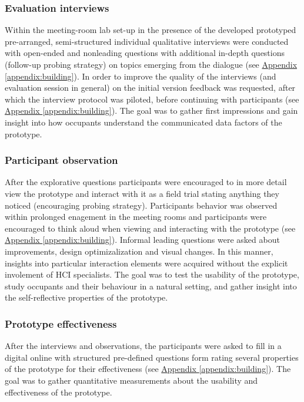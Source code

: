 \subsubsection{Evaluation interviews}

Within the meeting-room lab set-up in the presence of the developed prototyped pre-arranged, semi-structured individual qualitative interviews were conducted with open-ended and nonleading questions with additional in-depth questions (follow-up probing strategy) on topics emerging from the dialogue (see \hyperref[appendix:building]{Appendix \ref*{appendix:building}}). In order to improve the quality of the interviews (and evaluation session in general) on the initial version feedback was requested, after which the interview protocol was piloted, before continuing with participants (see \hyperref[appendix:building]{Appendix \ref*{appendix:building}}). The goal was to gather first impressions and gain insight into how occupants understand the communicated data factors of the prototype.

\subsubsection{Participant observation}

After the explorative questions participants were encouraged to in more detail view the prototype and interact with it as a field trial stating anything they noticed (encouraging probing strategy). Participants behavior was observed within prolonged enagement in the meeting rooms and participants were encouraged to think aloud when viewing and interacting with the prototype (see \hyperref[appendix:building]{Appendix \ref*{appendix:building}}). Informal leading questions were asked about improvements, design optimizalization and visual changes. In this manner, insights into particular interaction elements were acquired without the explicit involement of HCI specialists. The goal was to test the usability of the prototype, study occupants and their behaviour in a natural setting, and gather insight into the self-reflective properties of the prototype. 

\subsubsection{Prototype effectiveness}

After the interviews and observations, the participants were asked to fill in a digital online with structured pre-defined questions form rating several properties of the prototype for their effectiveness (see \hyperref[appendix:building]{Appendix \ref*{appendix:building}}). The goal was to gather quantitative measurements about the usability and effectiveness of the prototype.

